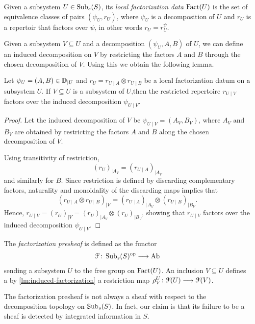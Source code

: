 \begin{definition}
    Given a subsystem $U\in \operatorname{Sub}_s(S)$, its \emph{local factorization data} $\operatorname{Fact}(U)$ is the set of equivalence classes of pairs $(\psi_U, r_U)$, where $\psi_U$ is a decomposition of $U$ and $r_U$ is a repertoir that factors over $\psi$, in other words $r_U=r_U^\psi$. 
\end{definition}

Given a subsystem $V\subseteq U$ and a decomposition $(\psi_U, A, B)$ of $U$, we can define an induced decomposition on $V$ by restricting the factors $A$ and $B$ through the chosen decomposition of $V$. Using this we obtain the following lemma. 

\begin{lemma}
    \label{lm:induced-factorization}
    Let $\psi_U=(A,B)\in\mathbb{D}_{\mid U}$ and $r_U=r_{U\mid A}\otimes r_{U\mid B}$ be a local factorization datum on a subsystem $U$. If $V\subseteq U$ is a subsystem of $U$,then the restricted repertoire $r_{U\mid V}$ factors over the induced decomposition $\psi_{U\mid V}$.
\end{lemma}
\begin{proof}
    Let the induced decomposition of $V$ be $\psi_{U\mid V}=(A_V,B_V)$, where $A_V$ and $B_V$ are obtained by restricting the factors $A$ and $B$ along the chosen decomposition of $V$.

    Using transitivity of restriction,
    \[(r_U)_{\mid A_V}=(r_{U\mid A})_{\mid A_V}\]
    and similarly for $B$. Since restriction is defined by discarding complementary factors, naturality and monoidality of the discarding maps implies that
    \[(r_{U\mid A}\otimes r_{U\mid B})_{\mid V}=(r_{U\mid A})_{\mid A_V}\otimes(r_{U\mid B})_{\mid B_V}.\]
    Hence, $r_{U\mid V}=(r_U)_{\mid V}=(r_U)_{\mid A_V}\otimes (r_U)_{\mid B_V}$, showing that $r_{U\mid V}$ factors over the induced decomposition $\psi_{U\mid V}$.
\end{proof}


\begin{definition}
    The \emph{factorization presheaf} is defined as the functor
    \[\EuScript{F}\colon \operatorname{Sub}_s(S)^{\mathrm{op}} \longrightarrow \mathrm{Ab}\]
    sending a subsystem $U$ to the free group on $\operatorname{Fact}(U)$. An inclusion $V\subseteq U$ defines a by \cref{lm:induced-factorization} a restriction map $\rho_V^U \colon \EuScript{F}(U) \longrightarrow \EuScript{F}(V)$.
\end{definition}

The factorization presheaf is not always a sheaf with respect to the decomposition topology on $\operatorname{Sub}_s(S)$. In fact, our claim is that its failure to be a sheaf is detected by integrated information in $S$. 

